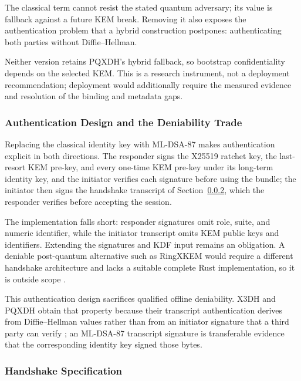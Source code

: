 The classical term cannot resist the stated quantum adversary; its value is fallback against a future KEM break. Removing it also exposes the authentication problem that a hybrid construction postpones: authenticating both parties without Diffie--Hellman.

Neither version retains PQXDH's hybrid fallback, so bootstrap confidentiality depends on the selected KEM. This is a research instrument, not a deployment recommendation; deployment would additionally require the measured evidence and resolution of the binding and metadata gaps.

\subsubsection{Authentication Design and the Deniability Trade}
\label{subsubsec:design-deniability}

Replacing the classical identity key with ML-DSA-87 makes authentication explicit in both directions. The responder signs the X25519 ratchet key, the last-resort KEM pre-key, and every one-time KEM pre-key under its long-term identity key, and the initiator verifies each signature before using the bundle; the initiator then signs the handshake transcript of Section~\ref{subsubsec:variant-spec}, which the responder verifies before accepting the session.

The implementation falls short: responder signatures omit role, suite, and numeric identifier, while the initiator transcript omits KEM public keys and identifiers. Extending the signatures and KDF input remains an obligation. A deniable post-quantum alternative such as RingXKEM would require a different handshake architecture and lacks a suitable complete Rust implementation, so it is outside scope \cite{katsumata_comprehensive_2025}.

This authentication design sacrifices qualified offline deniability. X3DH and PQXDH obtain that property because their transcript authentication derives from Diffie--Hellman values rather than from an initiator signature that a third party can verify \cite{kret_pqxdh_nodate}; an ML-DSA-87 transcript signature is transferable evidence that the corresponding identity key signed those bytes.

\subsubsection{Handshake Specification}
\label{subsubsec:variant-spec}

